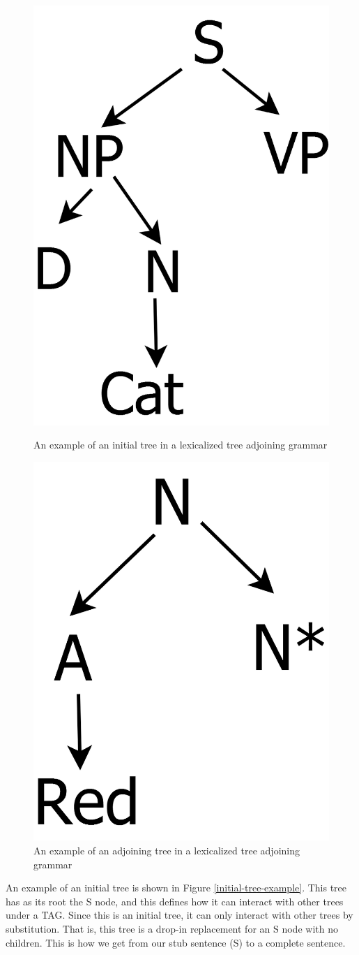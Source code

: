 \begin{figure}[ht]
\centering
\begin{minipage}[b]{0.45\linewidth}
\centering
\includegraphics[width=0.5\linewidth]{initial-example.png}
\caption{An example of an initial tree in a lexicalized tree adjoining grammar}
\label{initial-tree-example}
\end{minipage}
\quad
\begin{minipage}[b]{0.45\linewidth}
\centering
\includegraphics[width=0.5\linewidth]{adjoining-tree-example.png}
\caption{An example of an adjoining tree in a lexicalized tree adjoining grammar}
\label{adjoining-tree-example}
\end{minipage}
\end{figure}

An example of an initial tree is shown in Figure \ref{initial-tree-example}.
This tree has as its root the S node, and this defines how it can interact with other
trees under a TAG.  Since this is an initial tree, it can only interact with other trees by
substitution.  That is, this tree is a drop-in replacement for an S node with no children.
This is how we get from our stub sentence (S) to a complete sentence.


